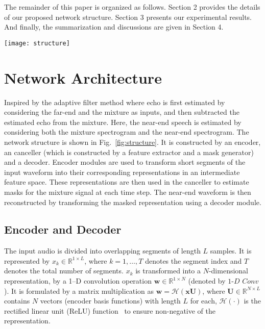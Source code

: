 \documentclass{article}
\begin{document}
\begin{sloppy}
The remainder of this paper is organized as follows. Section 2 provides the details of our proposed network structure. Section 3 presents our experimental results. And finally, the summarization and discussions are given in Section 4.

\begin{figure*}[htb]
\centering
\texttt{[image: structure]}
\caption{Network architecture.}
\label{fig:structure}
\end{figure*}

\section{Network Architecture}
\label{sec:structure}
Inspired by the adaptive filter method where echo is first estimated by considering the far-end and the mixture as inputs, and then subtracted the estimated echo from the mixture. Here, the near-end speech is estimated by considering both the mixture spectrogram and the near-end spectrogram. The network structure is shown in Fig.~\ref{fig:structure}. It is constructed by an encoder, an canceller (which is constructed by a feature extractor and a mask generator) and a decoder. Encoder modules are used to transform short segments of the input waveform into their corresponding representations in an intermediate feature space. These representations are then used in the canceller to estimate masks for the mixture signal at each time step. The near-end waveform is then reconstructed by transforming the masked representation using a decoder module.

\subsection{Encoder and Decoder}
\label{sec:encoder}
The input audio is divided into overlapping segments of length $L$ samples. It is represented by $x_{k} \in \mathbb{R}^{1 \times L}$, where $k=1, \ldots, {T}$ denotes the segment index and ${T}$ denotes the total number of segments. $x_{k}$ is transformed into a $N$-dimensional representation, by a 1--D convolution operation $\mathbf{w} \in \mathbb{R}^{1 \times N}$ (denoted by $1$-$D$ $Conv$). It is formulated by a matrix multiplication as ${\mathbf{w}}=\mathcal{H}(\mathrm{\mathbf{x}} \mathbf{U})$, where $\mathbf{U} \in \mathbb{R}^{N \times L}$ contains $N$ vectors (encoder basis functions) with length $L$ for each, $\mathcal{H}(\cdot)$ is the rectified linear unit (ReLU) function~\cite{ref_relu} to ensure non-negative of the representation.


\end{sloppy}
\end{document}
